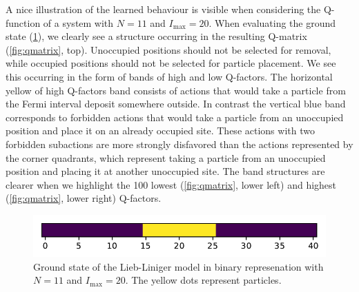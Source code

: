 \documentclass[11pt, a4paper]{report} %
\begin{document}
A nice illustration of the learned behaviour is visible when considering the Q-function of a system with \(N=11\) and \(I_{\max}=20\).
When evaluating the ground state (\cref{fig:binarygroundstate}), we clearly see a structure occurring in the resulting Q-matrix (\cref{fig:qmatrix}, top).
Unoccupied positions should not be selected for removal, while occupied positions should not be selected for particle placement.
We see this occurring in the form of bands of high and low Q-factors.
The horizontal yellow of high Q-factors band consists of actions that would take a particle from the Fermi interval deposit somewhere outside.
In contrast the vertical blue band corresponds to forbidden actions that would take a particle from an unoccupied position and place it on an already occupied site.
These actions with two forbidden subactions are more strongly disfavored than the actions represented by the corner quadrants, which represent taking a particle from an unoccupied position and placing it at another unoccupied site.
The band structures are clearer when we highlight the 100 lowest (\cref{fig:qmatrix}, lower left) and highest (\cref{fig:qmatrix}, lower right) Q-factors.

\begin{figure}[tb!]
  \centering
  \includegraphics{state.pdf}
  \caption{Ground state of the Lieb-Liniger model in binary represenation with \(N=11\) and \(I_{\max}=20\). The yellow dots represent particles.}
  \label{fig:binarygroundstate}
\end{figure}
\end{document}

